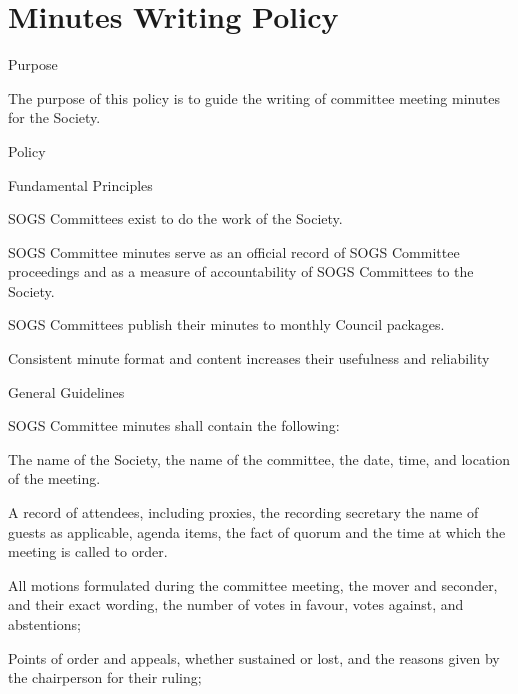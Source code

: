 \section{Minutes Writing Policy}
	\begin{longenum}[label*=\arabic*., align=left]
\item Purpose
	\begin{longenum}[label*=\arabic*., align=left]
\item The purpose of this policy is to guide the writing of committee meeting minutes for the Society.
	\end{longenum}
\item Policy
	\begin{longenum}[label*=\arabic*., align=left]
\item Fundamental Principles
	\begin{longenum}[label*=\arabic*., align=left]
		\item SOGS Committees exist to do the work of the Society.
		\item SOGS Committee minutes serve as an official record of SOGS Committee proceedings and as a measure of accountability of SOGS Committees to the Society.
		\item SOGS Committees publish their minutes to monthly Council packages.
		\item Consistent minute format and content increases their usefulness and reliability
	\end{longenum}
\item General Guidelines
	\begin{longenum}[label*=\arabic*., align=left]
	\item SOGS Committee minutes shall contain the following:
	\begin{longenum}[label*=\arabic*., align=left]
		\item The name of the Society, the name of the committee, the date, time, and location of the meeting.
		\item A record of attendees, including proxies, the recording secretary  the name of guests as applicable, agenda items, the fact of quorum and the time at which the meeting is called to order.
    	\item All motions formulated during the committee meeting, the mover and seconder, and their exact wording, the number of votes in favour, votes against, and abstentions;
		\item Points of order and appeals, whether sustained or lost, and the reasons given by the chairperson for their ruling;

\end{longenum}
\end{longenum}
\end{longenum}
\end{longenum}
